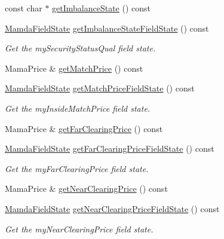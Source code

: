 \begin{CompactItemize}
const char $\ast$ \hyperlink{classWombat_1_1MamdaOrderImbalanceListener_0c165617508c80658877e499eb3c2e41}{get\-Imbalance\-State} () const 
\item 
\hyperlink{namespaceWombat_93aac974f2ab713554fd12a1fa3b7d2a}{Mamda\-Field\-State} \hyperlink{classWombat_1_1MamdaOrderImbalanceListener_63cc4f92d2bbd8f122922d5f4fb2932b}{get\-Imbalance\-State\-Field\-State} () const 
\begin{CompactList}\small\item\em Get the my\-Security\-Status\-Qual field state. \item\end{CompactList}\item 
Mama\-Price \& \hyperlink{classWombat_1_1MamdaOrderImbalanceListener_d55a2fc95960a2629c498eba6fb8b43d}{get\-Match\-Price} () const 
\item 
\hyperlink{namespaceWombat_93aac974f2ab713554fd12a1fa3b7d2a}{Mamda\-Field\-State} \hyperlink{classWombat_1_1MamdaOrderImbalanceListener_ca43f8571100db2c3dc6a81c9ece7d4b}{get\-Match\-Price\-Field\-State} () const 
\begin{CompactList}\small\item\em Get the my\-Inside\-Match\-Price field state. \item\end{CompactList}\item 
Mama\-Price \& \hyperlink{classWombat_1_1MamdaOrderImbalanceListener_f794cdda271d04cc569e18222146e3a6}{get\-Far\-Clearing\-Price} () const 
\item 
\hyperlink{namespaceWombat_93aac974f2ab713554fd12a1fa3b7d2a}{Mamda\-Field\-State} \hyperlink{classWombat_1_1MamdaOrderImbalanceListener_9a23b7703628b621deed5abcbc1b0e97}{get\-Far\-Clearing\-Price\-Field\-State} () const 
\begin{CompactList}\small\item\em Get the my\-Far\-Clearing\-Price field state. \item\end{CompactList}\item 
Mama\-Price \& \hyperlink{classWombat_1_1MamdaOrderImbalanceListener_179bd16864d6c3bc9bf7758759f2e336}{get\-Near\-Clearing\-Price} () const 
\item 
\hyperlink{namespaceWombat_93aac974f2ab713554fd12a1fa3b7d2a}{Mamda\-Field\-State} \hyperlink{classWombat_1_1MamdaOrderImbalanceListener_f7935fdf67c67ffefadc39456a39448d}{get\-Near\-Clearing\-Price\-Field\-State} () const 
\begin{CompactList}\small\item\em Get the my\-Near\-Clearing\-Price field state. \item\end{CompactList}\item 

\end{CompactItemize}
